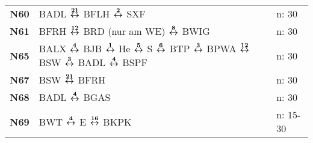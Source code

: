 \begin{minipage}[t]{0.45\textwidth}
\begin{tabular}{>{\bfseries}L{1.2cm}L{9.0cm}L{3.0cm}}
\nbus{} N60   & BADL $\boldsymbol{\overset{21}{\leftrightarrow}}$ BFLH $\boldsymbol{\overset{2}{\leftrightarrow}}$ SXF                                                                                                                              & n: 30                      \\
\nbus{} N61   & BFRH $\boldsymbol{\overset{12}{\leftrightarrow}}$ BRD (nur am WE) $\boldsymbol{\overset{8}{\leftrightarrow}}$ BWIG                                                                                                                  & n: 30                      \\
\nbus{} N65   & BALX $\boldsymbol{\overset{4}{\leftrightarrow}}$ BJB $\boldsymbol{\overset{1}{\leftrightarrow}}$ He $\boldsymbol{\overset{5}{\leftrightarrow}}$ S $\boldsymbol{\overset{6}{\leftrightarrow}}$ BTP $\boldsymbol{\overset{3}{\leftrightarrow}}$ BPWA $\boldsymbol{\overset{12}{\leftrightarrow}}$ BSW $\boldsymbol{\overset{3}{\leftrightarrow}}$ BADL $\boldsymbol{\overset{4}{\leftrightarrow}}$ BSPF                               & n: 30                      \\
\nbus{} N67   & BSW $\boldsymbol{\overset{21}{\leftrightarrow}}$ BFRH                                                                                                                                               & n: 30                      \\
\nbus{} N68   & BADL $\boldsymbol{\overset{4}{\leftrightarrow}}$ BGAS                                                                                                                                               & n: 30                      \\
\nbus{} N69   & BWT $\boldsymbol{\overset{4}{\leftrightarrow}}$ E $\boldsymbol{\overset{16}{\leftrightarrow}}$ BKPK                                                                                                                                 & n: 15-30                   \\
\hline
\end{tabular}
\end{minipage}
\begin{minipage}[t]{0.05\textwidth}
\phantom{Tor}
\end{minipage}

